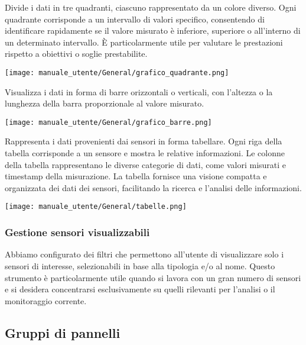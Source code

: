 Divide i dati in tre quadranti, ciascuno rappresentato da un colore diverso. Ogni quadrante corrisponde a un intervallo di valori specifico, consentendo di identificare rapidamente se il valore misurato è inferiore, superiore o all'interno di un determinato intervallo. È particolarmente utile per valutare le prestazioni rispetto a obiettivi o soglie prestabilite.
\begin{center}
    \texttt{[image: manuale\_utente/General/grafico\_quadrante.png]}
\end{center}

Visualizza i dati in forma di barre orizzontali o verticali, con l'altezza o la lunghezza della barra proporzionale al valore misurato. 
\begin{center}
    \texttt{[image: manuale\_utente/General/grafico\_barre.png]}
\end{center}

Rappresenta i dati provenienti dai sensori in forma tabellare. Ogni riga della tabella corrisponde a un sensore e mostra le relative informazioni. Le colonne della tabella rappresentano le diverse categorie di dati, come valori misurati e timestamp della misurazione. La tabella fornisce una visione compatta e organizzata dei dati dei sensori, facilitando la ricerca e l'analisi delle informazioni.
\begin{center}
    \texttt{[image: manuale\_utente/General/tabelle.png]}
\end{center} 


\subsubsection{Gestione sensori visualizzabili}
Abbiamo configurato dei filtri che permettono all'utente di visualizzare solo i sensori di interesse, selezionabili in base alla tipologia e/o al nome. Questo strumento è particolarmente utile quando si lavora con un gran numero di sensori e si desidera concentrarsi esclusivamente su quelli rilevanti per l'analisi o il monitoraggio corrente.
\newpage
\subsection{Gruppi di pannelli}
